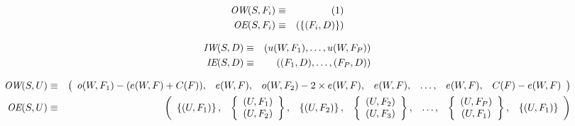 \begin{eqnarray*} 
\mbox{\it OW}(S,F_i) & \equiv & (1) \\
\mbox{\it OE}(S,F_i) & \equiv & (\{(F_i, D)\}) 
\end{eqnarray*} 

\begin{eqnarray*} 
\mbox{\it IW}(S,D) & \equiv & (u(W,F_1),\ldots,u(W, F_P)) \\
\mbox{\it IE}(S,D) & \equiv & ((F_1, D),\dots,(F_P, D)) 
\end{eqnarray*}

\begin{eqnarray*} 
\mbox{\it OW}(S,U) & \equiv & \left( \begin{array}{ccccccc} 
o(W,F_1) - (e(W,F) + C(F)), & e(W,F), & o(W,F_2) - 2 \times e(W,F), &
e(W,F), & \ldots, & e(W,F), & C(F) - e(W,F) \end{array} \right) \\
\mbox{\it OE}(S,U) & \equiv  & 
\left( 
\begin{array}{ccccccc} 
	\left\{ (U,F_1) \right\}, & 
	\left\{	
		\begin{array}{c} (U,F_1) \\ (U,F_2) 
		\end{array} 
	\right\}, &
	\left\{ (U,F_2) \right\}, & 
	\left\{	
		\begin{array}{c} (U,F_2) \\ (U,F_3) 
		\end{array} 
	\right\}, &
	\ldots, & 	
	\left\{	
		\begin{array}{c} (U,F_P) \\ (U,F_1) 
		\end{array} 
	\right\}, &
	\left\{ (U,F_1) \right\} 
\end{array} \right)
\end{eqnarray*} 
